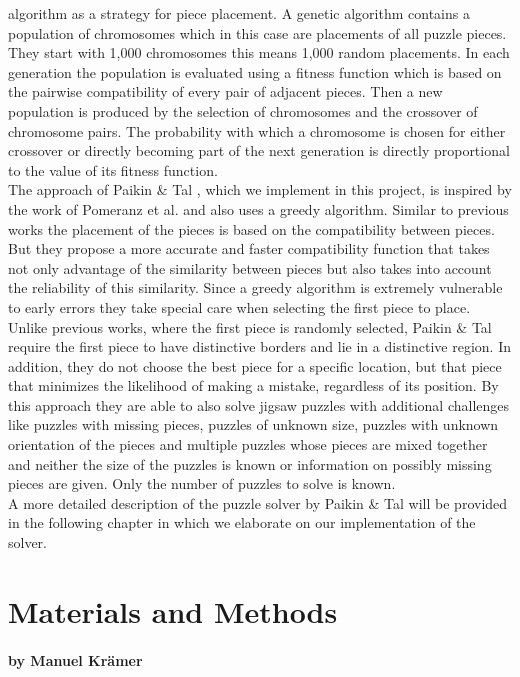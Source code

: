 \documentclass[11pt]{report}
\begin{document}
algorithm as a strategy for piece placement. A genetic algorithm contains a
population of chromosomes which in this case are placements of all puzzle
pieces. They start with 1,000 chromosomes this means 1,000 random placements. In
each generation the population is evaluated using a fitness function which is
based on the pairwise compatibility of every pair of adjacent pieces. Then a new
population is produced by the selection of chromosomes and the crossover of
chromosome pairs. The probability with which a chromosome is chosen for either
crossover or directly becoming part of the next generation is directly
proportional to the value of its fitness function. \\
The approach of Paikin \& Tal \cite{Paikin2015}, which we implement in this
project, is inspired by the work of Pomeranz et al. \cite{Pomeranz2011} and also
uses a greedy algorithm. Similar to previous works the placement of the pieces
is based on the compatibility between pieces. But they propose a more accurate
and faster compatibility function that takes not only advantage of the
similarity between pieces but also takes into account the reliability of this
similarity. Since a greedy algorithm is extremely vulnerable to early errors
they take special care when selecting the first piece to place. Unlike previous
works, where the first piece is randomly selected, Paikin \& Tal require the first piece
to have distinctive borders and lie in a distinctive region. In addition, they
do not choose the best piece for a specific location, but that piece that
minimizes the likelihood of making a mistake, regardless of its position. By
this approach they are able to also solve jigsaw puzzles with additional
challenges like puzzles with missing pieces, puzzles of unknown size, puzzles
with unknown orientation of the pieces and multiple puzzles whose pieces are
mixed together and neither the size of the puzzles is known or information on
possibly missing pieces are given. Only the number of puzzles to solve is known. \\
A more detailed description of the puzzle solver by Paikin \& Tal will be
provided in the following chapter in which we elaborate on our implementation of
the solver.

\chapter{Materials and Methods}
\subsubsection*{by Manuel Krämer}
\end{document}
